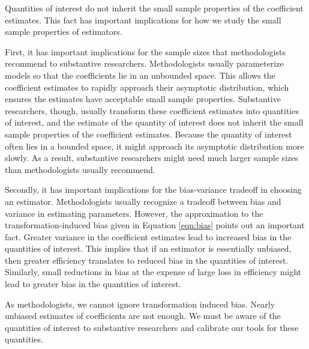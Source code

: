 \documentclass[12pt]{article}
\begin{document}
Quantities of interest do not inherit the small sample properties of the coefficient estimates.
This fact has important implications for how we study the small sample properties of estimators. 

First, it has important implications for the sample sizes that methodologists recommend to substantive researchers. 
Methodologists usually parameterize models so that the coefficients lie in an unbounded space. 
This allows the coefficient estimates to rapidly approach their asymptotic distribution, which ensures the estimates have acceptable small sample properties. 
Substantive researchers, though, usually transform these coefficient estimates into quantities of interest, and the estimate of the quantity of interest does not inherit the small sample properties of the coefficient estimates. 
Because the quantity of interest often lies in a bounded space, it might approach its asymptotic distribution more slowly. 
As a result, substantive researchers might need much larger sample sizes than methodologists usually recommend.

Secondly, it has important implications for the bias-variance tradeoff in choosing an estimator. 
Methodologists usually recognize a tradeoff between bias and variance in estimating parameters. 
However, the approximation to the transformation-induced bias given in Equation \ref{eqn:bias} points out an important fact. 
Greater variance in the coefficient estimates lead to increased bias in the quantities of interest. 
This implies that if an estimator is essentially unbiased, then greater efficiency translates to reduced bias in the quantities of interest. 
Similarly, small reductions in bias at the expense of large loss in efficiency might lead to greater bias in the quantities of interest. 

As methodologists, we cannot ignore transformation induced bias. Nearly unbiased estimates of coefficients are not enough. We must be aware of the quantities of interest to substantive researchers and calibrate our tools for these quantities.

\singlespace 
\small


\end{document}
